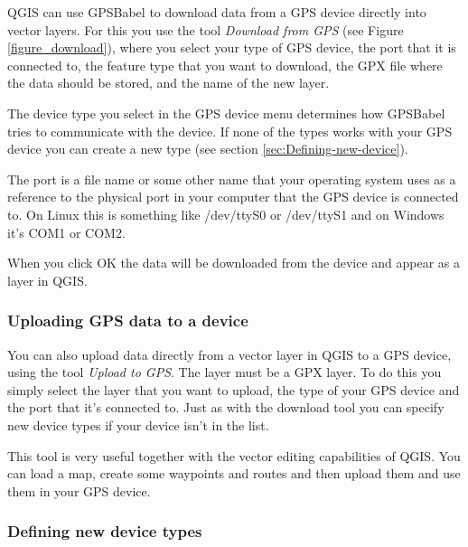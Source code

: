 QGIS can use GPSBabel to download data from a GPS device directly
into vector layers. For this you use the tool \emph{Download from
GPS} (see Figure \ref{figure_download}), where you select your type
of GPS device, the port that it is connected to, the feature type
that you want to download, the GPX file where the data should be stored,
and the name of the new layer.



The device type you select in the GPS device menu determines how GPSBabel
tries to communicate with the device. If none of the types
works with your GPS device you can create a new type (see section
\ref{sec:Defining-new-device}).

The port is a file name or some other name that your operating system
uses as a reference to the physical port in your computer that the
GPS device is connected to. On Linux this is something like /dev/ttyS0
or /dev/ttyS1 and on Windows it's COM1 or COM2.

When you click OK the data will be downloaded from the device and
appear as a layer in QGIS.

\subsubsection{Uploading GPS data to a device}

You can also upload data directly from a vector layer in QGIS to a
GPS device, using the tool \emph{Upload to GPS}. The layer must be
a GPX layer. To do this you simply select the layer that you want
to upload, the type of your GPS device and the port that it's connected
to. Just as with the download tool you can specify new device types
if your device isn't in the list.

This tool is very useful together with the vector editing capabilities
of QGIS. You can load a map, create some waypoints and routes and
then upload them and use them in your GPS device.

\subsubsection{\label{sec:Defining-new-device}Defining new device types}

